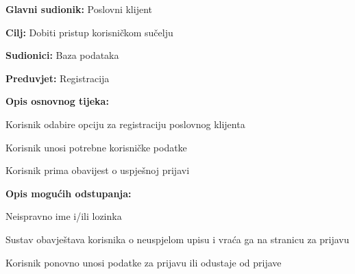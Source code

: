 					\noindent {}
					\begin{packed_item}
						
						\item \textbf{Glavni sudionik: } Poslovni klijent
						\item  \textbf{Cilj:} Dobiti pristup korisničkom sučelju
						\item  \textbf{Sudionici:} Baza podataka
						\item  \textbf{Preduvjet:} Registracija
						\item  \textbf{Opis osnovnog tijeka:}
						
						\item[] \begin{packed_enum}
							
							\item Korisnik odabire opciju za registraciju poslovnog klijenta
							\item Korisnik unosi potrebne korisničke podatke
							\item Korisnik prima obavijest o uspješnoj prijavi
						\end{packed_enum}
						
						\item  \textbf{Opis mogućih odstupanja:}
						
						\item[] \begin{packed_item}
							
							\item[2.a]  Neispravno ime i/ili lozinka
							\item[] \begin{packed_enum}
								
								\item Sustav obavještava korisnika o neuspjelom upisu i vraća ga na stranicu za prijavu
								\item Korisnik ponovno unosi podatke za prijavu ili odustaje od prijave
								
							\end{packed_enum}
						\end{packed_item}
					\end{packed_item}
				
